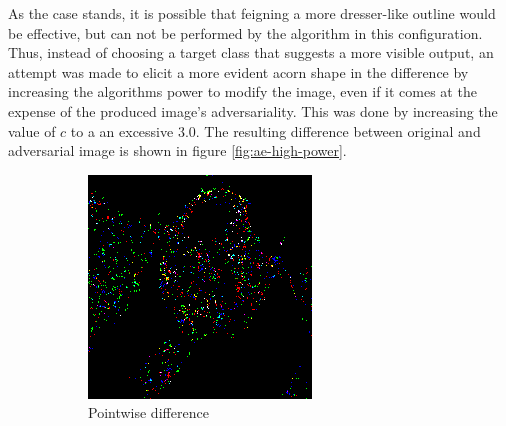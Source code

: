 \documentclass[11pt, a4paper]{article}
\begin{document}
As the case stands, it is possible that feigning a more dresser-like outline would be effective, but can not be performed by the algorithm in this configuration. Thus, instead of choosing a target class that suggests a more visible output, an attempt was made to elicit a more evident acorn shape in the difference by increasing the algorithms power to modify the image, even if it comes at the expense of the produced image's adversariality. This was done by increasing the value of $c$ to a an excessive $3.0$. The resulting difference between original and adversarial image is shown in figure \ref{fig:ae-high-power}.

\begin{figure}[h!tb]
    \centering
    \begin{subfigure}[t]{0.45\textwidth}
        \includegraphics[width=\textwidth]{aes/panda_acorn_10_3dot0_posdiff.png}
        \caption{Pointwise difference}
        \label{fig:ae-high-power-img}
    \end{subfigure}
    ~ %
    \begin{subfigure}[t]{0.45\textwidth}

\end{subfigure}
\end{figure}
\end{document}
